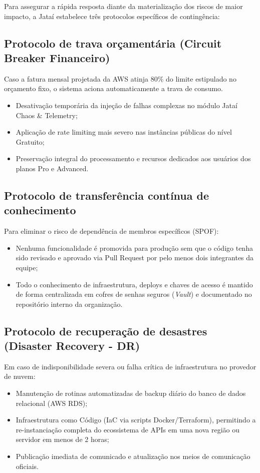 \documentclass[
  12pt,
  openright,
  oneside,
  a4paper,
  brazilian
]{abntex2}
\begin{document}
Para assegurar a rápida resposta diante da materialização dos riscos de maior impacto, a Jataí estabelece três protocolos específicos de contingência:

\subsection{Protocolo de trava orçamentária (Circuit Breaker Financeiro)}
Caso a fatura mensal projetada da AWS atinja $80\%$ do limite estipulado no orçamento fixo, o sistema aciona automaticamente a trava de consumo.
\begin{itemize}
    \item Desativação temporária da injeção de falhas complexas no módulo Jataí Chaos \& Telemetry;
    \item Aplicação de rate limiting mais severo nas instâncias públicas do nível Gratuito;
    \item Preservação integral do processamento e recursos dedicados aos usuários dos planos Pro e Advanced.
\end{itemize}

\subsection{Protocolo de transferência contínua de conhecimento}
Para eliminar o risco de dependência de membros específicos (SPOF):
\begin{itemize}
    \item Nenhuma funcionalidade é promovida para produção sem que o código tenha sido revisado e aprovado via Pull Request por pelo menos dois integrantes da equipe;
    \item Todo o conhecimento de infraestrutura, deploys e chaves de acesso é mantido de forma centralizada em cofres de senhas seguros (\textit{Vault}) e documentado no repositório interno da organização.
\end{itemize}

\subsection{Protocolo de recuperação de desastres (Disaster Recovery - DR)}
Em caso de indisponibilidade severa ou falha crítica de infraestrutura no provedor de nuvem:
\begin{itemize}
    \item Manutenção de rotinas automatizadas de backup diário do banco de dados relacional (AWS RDS);
    \item Infraestrutura como Código (IaC via scripts Docker/Terraform), permitindo a re-instanciação completa do ecossistema de APIs em uma nova região ou servidor em menos de 2 horas;
    \item Publicação imediata de comunicado e atualização nos meios de comunicação oficiais.
\end{itemize}
\end{document}
